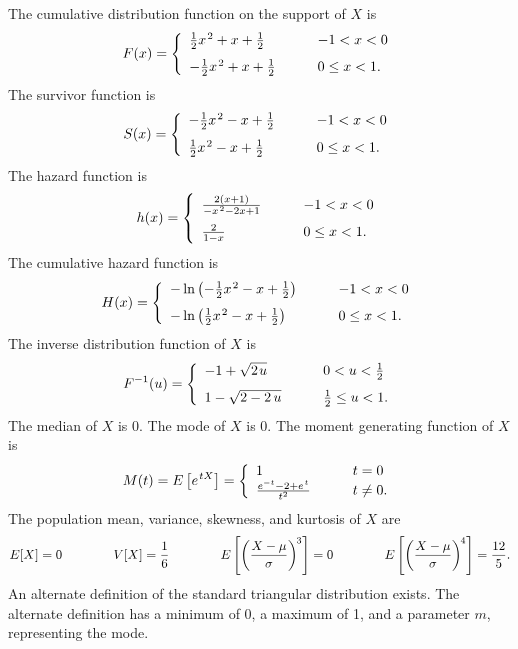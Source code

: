 \documentclass[12pt,fullpage]{article}
\begin{document}
\noindent
The cumulative distribution function on
the support of $X$ is
$$
F(x) = \left\{ \begin{array}{ll} 
       \frac{1} {2} x ^ {\kern 0.08 em 2} + x + \frac{1} {2} & \qquad -1 < x < 0 \\ [0.1in]
        - \frac{1} {2} x ^ {\kern 0.08 em 2} + x + \frac{1}{2} & \qquad 0 \le x < 1. \\ 
       \end{array} \right. 
$$
The survivor function is
$$
S(x) = \left\{ \begin{array}{ll} 
       -\frac{1} {2} x ^ {\kern 0.08 em 2} - x + \frac{1} {2}& \qquad -1 < x < 0 \\ [0.1in]
       \frac{1} {2} x ^ {\kern 0.08 em 2} - x + \frac{1} {2} & \qquad 0 \le x < 1. 
       \end{array} \right. 
$$
The hazard function is
$$
h(x) = \left\{ \begin{array}{ll} 
      \frac{2 (x + 1)}{-x ^ {\kern 0.08 em 2} - 2x + 1}& \qquad -1 < x < 0 \\ [0.1in]
       \frac{2}{1-x} & \qquad 0 \le x < 1.
       \end{array} \right. 
$$
The cumulative hazard function is
$$
H(x) =  \left\{ \begin{array}{ll} 
      -\ln \left( -\frac{1} {2} x ^ {\kern 0.08 em 2} - x + \frac{1} {2} \right)& \qquad -1 < x < 0 \\ [0.1in]
        -\ln \left(\frac{1} {2} x ^ {\kern 0.08 em 2} - x + \frac{1} {2} \right)& \qquad 0 \le x < 1. 
       \end{array} \right. 
$$
The inverse distribution function of $X$ is
$$
F^{-1}(u) = \left\{ \begin{array}{ll} 
       -1 + \sqrt {2 \kern 0.08 em u} & \qquad 0 < u < \frac{1}{2} \\ [0.1in]
       1 - \sqrt {2 - 2 \, u} & \qquad \frac{1}{2} \le u < 1 .
       \end{array} \right. 
$$
The median of $X$ is 0.
The mode of $X$ is 0.
The moment generating function of $X$ is
$$
M(t) = E\left[ e ^ {\kern 0.08 em tX} \right] = \left\{ \begin{array}{ll}
       1 & \qquad t = 0 \\
       {\frac {{ e ^ {-t}} - 2 + { e ^ {\kern 0.08 em t}}}{{t} ^ {2}}} & \qquad t \ne 0.
       \end{array} \right.
$$
The population mean, variance, skewness, and kurtosis of $X$ are
$$
E[X] = 0 \qquad \qquad 
V[X] = \frac{1} {6} \qquad \qquad 
E\left[ \left( \frac{X - \mu} {\sigma} \right) ^ {\kern -0.08 em 3} \right] = 0 \qquad \qquad 
E\left[ \left( \frac{X - \mu} {\sigma} \right) ^ {\kern -0.08 em 4} \right] = \frac{12} {5}.
$$
An alternate definition of the standard triangular distribution exists. The alternate definition has a minimum of 0, a maximum of 1, and a parameter $m$, representing the mode.
\end{document}
